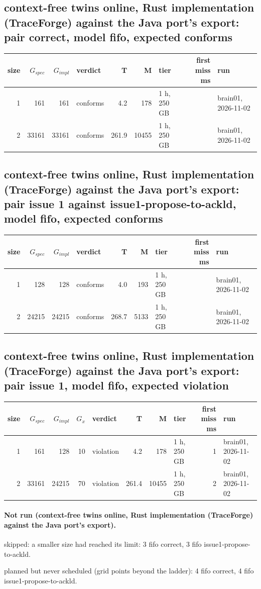 \documentclass[10pt]{article}
\begin{document}
\subsection*{context-free twins online, Rust implementation (TraceForge) against the Java port's export: pair \textsf{correct}, model fifo, expected conforms}
\begin{longtable}{@{}rrrlrrlrl@{}}
\toprule
size & $G_{\mathit{spec}}$ & $G_{\mathit{impl}}$ & verdict & T & M & tier & first miss ms & run \\
\midrule
\endhead
\color{red} 1 & 161 & 161 & conforms & 4.2 & 178 & 1 h, 250 GB &  & brain01, 2026-11-02 \\
\color{red} 2 & 33161 & 33161 & conforms & 261.9 & 10455 & 1 h, 250 GB &  & brain01, 2026-11-02 \\
\bottomrule
\end{longtable}
\subsection*{context-free twins online, Rust implementation (TraceForge) against the Java port's export: pair \textsf{issue 1} against \textsf{issue1-propose-to-ackld}, model fifo, expected conforms}
\begin{longtable}{@{}rrrlrrlrl@{}}
\toprule
size & $G_{\mathit{spec}}$ & $G_{\mathit{impl}}$ & verdict & T & M & tier & first miss ms & run \\
\midrule
\endhead
\color{red} 1 & 128 & 128 & conforms & 4.0 & 193 & 1 h, 250 GB &  & brain01, 2026-11-02 \\
\color{red} 2 & 24215 & 24215 & conforms & 268.7 & 5133 & 1 h, 250 GB &  & brain01, 2026-11-02 \\
\bottomrule
\end{longtable}
\subsection*{context-free twins online, Rust implementation (TraceForge) against the Java port's export: pair \textsf{issue 1}, model fifo, expected violation}
\begin{longtable}{@{}rrrrlrrlrl@{}}
\toprule
size & $G_{\mathit{spec}}$ & $G_{\mathit{impl}}$ & $G_x$ & verdict & T & M & tier & first miss ms & run \\
\midrule
\endhead
\color{red} 1 & 161 & 128 & 10 & violation & 4.2 & 178 & 1 h, 250 GB & 1 & brain01, 2026-11-02 \\
\color{red} 2 & 33161 & 24215 & 70 & violation & 261.4 & 10455 & 1 h, 250 GB & 2 & brain01, 2026-11-02 \\
\bottomrule
\end{longtable}
\paragraph{Not run (context-free twins online, Rust implementation (TraceForge) against the Java port's export).}
skipped: a smaller size had reached its limit: 3 fifo correct, 3 fifo issue1-propose-to-ackld.\par
planned but never scheduled (grid points beyond the ladder): 4 fifo correct, 4 fifo issue1-propose-to-ackld.\par
\end{document}
